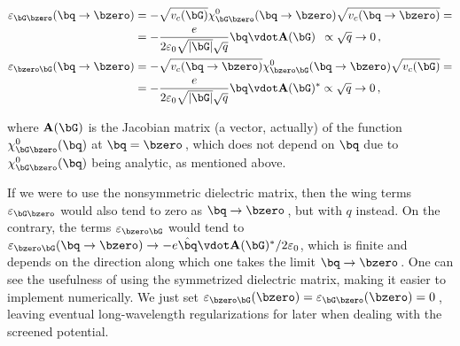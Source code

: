 
\begin{align}
    \varepsilon_{\bG \bzero} (\bq \to \bzero) & = -\sqrt{v_c(\bG)} \chi^0_{\bG \bzero} (\bq \to \bzero) \sqrt{v_c(\bq \to \bzero)} = \notag \\
                                              & = -\frac{e}{2 \varepsilon_0 \sqrt{|\bG|} \sqrt{q}} \bq \vdot \mathbf{A}(\bG) \,\,\, \propto \sqrt{q} \to 0 \,, \\
    \varepsilon_{\bzero \bG} (\bq \to \bzero) & = -\sqrt{v_c(\bq \to \bzero)} \chi^0_{\bzero \bG} (\bq \to \bzero) \sqrt{v_c(\bG)} = \notag \\
                                              & = -\frac{e}{2 \varepsilon_0 \sqrt{|\bG|} \sqrt{q}} \bq \vdot \mathbf{A}(\bG)^{*} \propto \sqrt{q} \to 0 \,,
\end{align}

\noindent where $\mathbf{A}(\bG)$ is the Jacobian matrix (a vector, actually) of the function $\chi^0_{\bG \bzero} (\bq)$ at $\bq = \bzero$\,, which does not depend on $\bq$ due to $\chi^0_{\bG \bzero} (\bq)$ being analytic, as mentioned above.

If we were to use the nonsymmetric dielectric matrix, then the wing terms $\varepsilon_{\bG \bzero}$ would also tend to zero as $\bq \to \bzero$\,, but with $q$ instead.
On the contrary, the terms $\varepsilon_{\bzero \bG}$ would tend to $\varepsilon_{\bzero \bG}(\bq \to \bzero) \to -e \hat{\bq} \vdot \mathbf{A}(\bG)^{*}/2\varepsilon_0$, which is finite and depends on the direction along which one takes the limit $\bq \to \bzero$\,.
One can see the usefulness of using the symmetrized dielectric matrix, making it easier to implement numerically.
We just set $\varepsilon_{\bzero \bG}(\bzero) = \varepsilon_{\bG \bzero}(\bzero) = 0$\,, leaving eventual long-wavelength regularizations for later when dealing with the screened potential.

